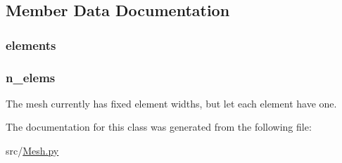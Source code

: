 \subsection{Member Data Documentation}
\hypertarget{classsrc_1_1_mesh_1_1_mesh_aa9aaa650bacb9b91c82437c2ce48f50c}{
\subsubsection[{elements}]{\setlength{\rightskip}{0pt plus 5cm}elements}}\label{classsrc_1_1_mesh_1_1_mesh_aa9aaa650bacb9b91c82437c2ce48f50c}
\hypertarget{classsrc_1_1_mesh_1_1_mesh_ac31c5f98a6c4c5374dc0de3dad36e81e}{
\subsubsection[{n\-\_\-elems}]{\setlength{\rightskip}{0pt plus 5cm}n\-\_\-elems}}\label{classsrc_1_1_mesh_1_1_mesh_ac31c5f98a6c4c5374dc0de3dad36e81e}


The mesh currently has fixed element widths, but let each element have one. 



The documentation for this class was generated from the following file\-:\begin{DoxyCompactItemize}
\item 
src/\hyperlink{_mesh_8py}{Mesh.\-py}\end{DoxyCompactItemize}
